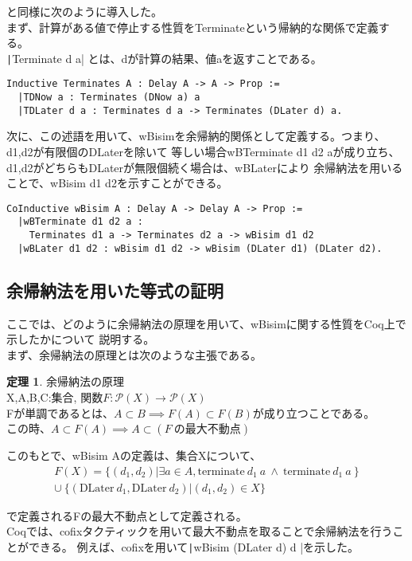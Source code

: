 \documentclass[japanese]{jssst_ppl}
\theoremstyle{definition}
\newtheorem{theorem}{定理}
\begin{document}
\cite{lmcs:2265}と同様に次のように導入した。\\


まず、計算がある値で停止する性質をTerminateという帰納的な関係で定義する。\\
\texttt|Terminate d a| とは、dが計算の結果、値aを返すことである。
\begin{verbatim}
Inductive Terminates A : Delay A -> A -> Prop :=
  |TDNow a : Terminates (DNow a) a
  |TDLater d a : Terminates d a -> Terminates (DLater d) a.
\end{verbatim}
次に、この述語を用いて、wBisimを余帰納的関係として定義する。つまり、d1,d2が有限個のDLaterを除いて
等しい場合wBTerminate d1 d2 aが成り立ち、d1,d2がどちらもDLaterが無限個続く場合は、wBLaterにより
余帰納法を用いることで、wBisim d1 d2を示すことができる。
\begin{verbatim}
CoInductive wBisim A : Delay A -> Delay A -> Prop :=
  |wBTerminate d1 d2 a :
    Terminates d1 a -> Terminates d2 a -> wBisim d1 d2
  |wBLater d1 d2 : wBisim d1 d2 -> wBisim (DLater d1) (DLater d2).
\end{verbatim}

\subsection{余帰納法を用いた等式の証明}
ここでは、どのように余帰納法の原理を用いて、wBisimに関する性質をCoq上で示したかについて
説明する。\\
まず、余帰納法の原理とは次のような主張である。
\begin{theorem}{余帰納法の原理\\}
  X,A,B,C:集合,
  関数$F:\mathcal{P}(X) \to \mathcal{P}(X)$\\
  Fが単調であるとは、$A \subset B \implies F(A) \subset F(B)$が成り立つことである。\\
  この時、$A \subset F(A) \implies A \subset (F \ \text{の最大不動点})$
\end{theorem}
このもとで、wBisim Aの定義は、集合Xについて、
\begin{align*}
  F(X) = \{ (d_1, d_2) | \exists a \in A, \text{terminate} \ d_1 \ a \ \land \ \text{terminate} \ d_1 \ a \ \} \\
  \cup \ \{ (\text{DLater} \ d_1, \text{DLater} \  d_2) | (d_1, d_2) \in X\}
\end{align*}


で定義されるFの最大不動点として定義される。\\
Coqでは、cofixタクティックを用いて最大不動点を取ることで余帰納法を行うことができる。
例えば、cofixを用いて\texttt|wBisim (DLater d) d |を示した。
\end{document}
